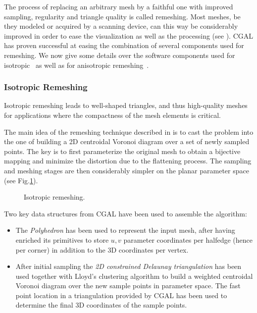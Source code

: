 \label{sec:remeshing}


The process of replacing an arbitrary mesh by a faithful one with
improved sampling, regularity and triangle quality is called
remeshing. Most meshes, be they modeled or acquired by a scanning
device, can this way be considerably improved in order to ease the
visualization as well as the processing (see \cite{ss-dgp-01}). CGAL
has proven successful at easing the combination of several components
used for remeshing. We now give some details over the software
components used for isotropic~\cite{acdi-isr-03} as well as for
anisotropic remeshing~\cite{acdld-apr-03}.

\subsubsection{Isotropic Remeshing}


Isotropic remeshing leads to well-shaped triangles, and thus
high-quality meshes for applications where the compactness of the mesh
elements is critical.


The main idea of the remeshing technique described in
\cite{acdi-isr-03} is to cast the problem into the
one of building a 2D centroidal Voronoi diagram over a set of newly
sampled points. The key is to first parameterize the original mesh to
obtain a bijective mapping and minimize the distortion due to the
flattening process. The sampling and meshing stages are then
considerably simpler on the planar parameter space (see
Fig.\ref{fig:isotropic}).

\begin{figure}
  \centering
  \caption{Isotropic remeshing.}
  \label{fig:isotropic}
\end{figure}



Two key data structures from CGAL have been used to assemble the
algorithm:

\begin{itemize}

\item 
The \emph{Polyhedron} has been used to represent the input mesh, after
having enriched its primitives to store $u,v$ parameter coordinates
per halfedge (hence per corner) in addition to the 3D coordinates per
vertex.

\item 
After initial sampling the \emph{2D constrained Delaunay
triangulation} has been used together with Lloyd's clustering
algorithm to build a weighted centroidal Voronoi diagram over the new
sample points in parameter space. The fast point location in a
triangulation provided by CGAL has been used to determine the final 3D
coordinates of the sample points.

\end{itemize}


